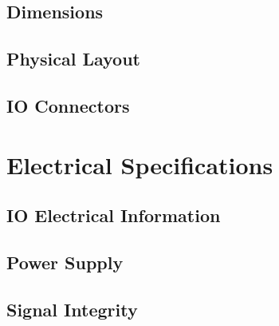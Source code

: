 \documentclass[letterpaper, 11pt, twoside]{article}
\begin{document}
\paragraph{}

\subsection{Dimensions}
\paragraph{}

\subsection{Physical Layout}
\paragraph{}

\subsection{IO Connectors}
\paragraph{}

\cleardoublepage
\section{Electrical Specifications}
\paragraph{}

\subsection{IO Electrical Information}
\paragraph{}

\subsection{Power Supply}
\paragraph{}

\subsection{Signal Integrity}
\paragraph{}

\cleardoublepage
\end{document}
